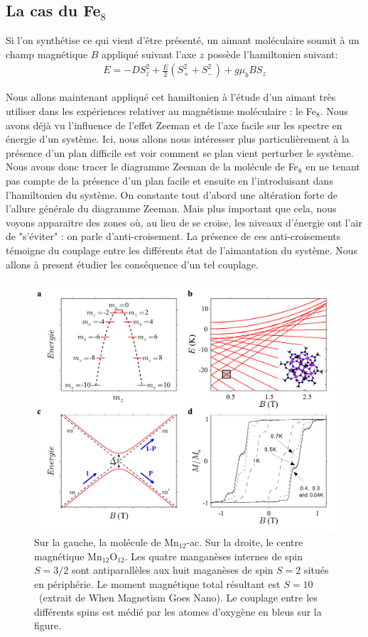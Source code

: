 \subsection{La cas du Fe$_8$}
Si l'on synthétise ce qui vient d'\^etre présenté, un aimant moléculaire soumit à un champ magnétique $B$ appliqué suivant l'axe $z$ possède l'hamiltonien suivant:
\begin{eqnarray}
E =  -DS_z^2 + \frac{E}{2} ( S_+^2  + S_-^2) + g\mu_b B S_z 
\end{eqnarray}


Nous allons maintenant appliqué cet hamiltonien à l'étude d'un aimant très utiliser dans les expériences relativer au magnétisme moléculaire : le Fe$_8$. Nous avons déjà vu l'influence de l'effet Zeeman et de l'axe facile sur les spectre en énergie d'un système. Ici, nous allons nous intéresser plus particulièrement à la présence d'un plan difficile est voir comment se plan vient perturber le système. Nous avons donc tracer le diagramme Zeeman de la molécule de Fe$_8$ en ne tenant pas compte de la présence d'un plan facile et ensuite en l'introduisant dans l'hamiltonien du système. On constante tout d'abord une altération forte de l'allure générale du diagramme Zeeman. Mais plus important que cela, nous voyons apparaitre des zones où, au lieu de se croise, les niveaux d'énergie ont l'air de "s'éviter" : on parle d'anti-croisement. La présence de ces anti-croisements témoigne du couplage entre les différents état de l'aimantation du système. Nous allons à present étudier les conséquence d'un tel couplage.

\begin{figure}
\centering \includegraphics[scale=0.5]{Theorie/MagMol/figure3/figure3.pdf} 
\caption{Sur la gauche, la molécule de Mn$_{12}$-ac. Sur la droite, le centre magnétique Mn$_{12}$O$_{12}$. Les quatre manganèses internes de spin $S=3/2$ sont antiparallèles aux huit maganèses de spin $S=2$ situés en périphérie. Le moment magnétique total résultant est $S=10$~(extrait de When Magnetism Goes Nano). Le couplage entre les différents spins est médié par les atomes d'oxygène en bleus sur la figure.}
\label{Fe8Zeeman}
\end{figure}

